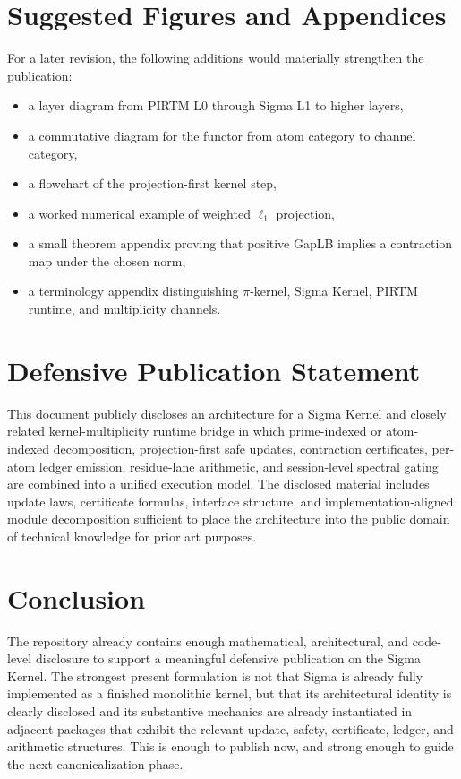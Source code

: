 \documentclass[11pt]{article}
\begin{document}
\section{Suggested Figures and Appendices}
For a later revision, the following additions would materially strengthen the publication:
\begin{itemize}[leftmargin=2em]
    \item a layer diagram from PIRTM L0 through Sigma L1 to higher layers,
    \item a commutative diagram for the functor from atom category to channel category,
    \item a flowchart of the projection-first kernel step,
    \item a worked numerical example of weighted $\ell_1$ projection,
    \item a small theorem appendix proving that positive GapLB implies a contraction map under the chosen norm,
    \item a terminology appendix distinguishing $\pi$-kernel, Sigma Kernel, PIRTM runtime, and multiplicity channels.
\end{itemize}

\section{Defensive Publication Statement}
This document publicly discloses an architecture for a Sigma Kernel and closely related kernel-multiplicity runtime bridge in which prime-indexed or atom-indexed decomposition, projection-first safe updates, contraction certificates, per-atom ledger emission, residue-lane arithmetic, and session-level spectral gating are combined into a unified execution model. The disclosed material includes update laws, certificate formulas, interface structure, and implementation-aligned module decomposition sufficient to place the architecture into the public domain of technical knowledge for prior art purposes.

\section{Conclusion}
The repository already contains enough mathematical, architectural, and code-level disclosure to support a meaningful defensive publication on the Sigma Kernel. The strongest present formulation is not that Sigma is already fully implemented as a finished monolithic kernel, but that its architectural identity is clearly disclosed and its substantive mechanics are already instantiated in adjacent packages that exhibit the relevant update, safety, certificate, ledger, and arithmetic structures. This is enough to publish now, and strong enough to guide the next canonicalization phase.
\end{document}
